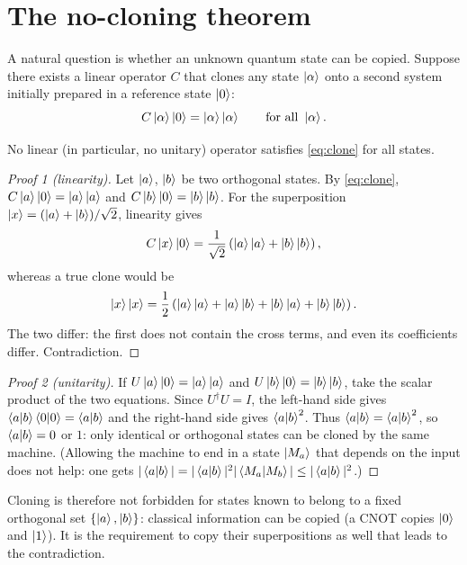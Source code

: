 \section{The no-cloning theorem}\label{sec:nocloning}
A natural question is whether an unknown quantum state can be copied. Suppose there exists a linear operator $C$ that clones any state $\left|\alpha\right\rangle$
onto a second system initially prepared in a reference state $\left|0\right\rangle$:
\begin{equation}\label{eq:clone}
  C\left|\alpha\right\rangle\left|0\right\rangle=\left|\alpha\right\rangle\left|\alpha\right\rangle\qquad\text{for all }\left|\alpha\right\rangle.
\end{equation}
\begin{theorem}
No linear (in particular, no unitary) operator satisfies \cref{eq:clone} for all states.
\end{theorem}
\begin{proof}[Proof 1 (linearity)]
Let $\left|a\right\rangle$, $\left|b\right\rangle$ be two orthogonal states. By \cref{eq:clone}, $C\left|a\right\rangle\left|0\right\rangle=\left|a\right\rangle\left|a\right\rangle$ and $C\left|b\right\rangle\left|0\right\rangle=\left|b\right\rangle\left|b\right\rangle$. For the
superposition $\left|x\right\rangle=(\left|a\right\rangle+\left|b\right\rangle)/\sqrt2$, linearity gives
\begin{equation}
  C\left|x\right\rangle\left|0\right\rangle=\frac1{\sqrt2}\left(\left|a\right\rangle\left|a\right\rangle+\left|b\right\rangle\left|b\right\rangle\right),
\end{equation}
whereas a true clone would be
\begin{equation}
  \left|x\right\rangle\left|x\right\rangle=\frac12\left(\left|a\right\rangle\left|a\right\rangle+\left|a\right\rangle\left|b\right\rangle+\left|b\right\rangle\left|a\right\rangle+\left|b\right\rangle\left|b\right\rangle\right).
\end{equation}
The two differ: the first does not contain the cross terms, and even its coefficients differ. Contradiction.
\end{proof}
\begin{proof}[Proof 2 (unitarity)]
If $U\left|a\right\rangle\left|0\right\rangle=\left|a\right\rangle\left|a\right\rangle$ and $U\left|b\right\rangle\left|0\right\rangle=\left|b\right\rangle\left|b\right\rangle$, take the scalar product of the two equations. Since $U^\dagger U=I$, the left-hand side gives
$\left\langle a\middle|b\right\rangle\left\langle0\middle|0\right\rangle=\left\langle a\middle|b\right\rangle$ and the right-hand side gives $\left\langle a\middle|b\right\rangle^2$. Thus $\left\langle a\middle|b\right\rangle=\left\langle a\middle|b\right\rangle^2$, so $\left\langle a\middle|b\right\rangle=0$ or $1$:
only identical or orthogonal states can be cloned by the same machine. (Allowing the machine to end in a state $\left|M_a\right\rangle$ that depends on the input does
not help: one gets $|\left\langle a\middle|b\right\rangle|=|\left\langle a\middle|b\right\rangle|^2|\left\langle M_a\middle|M_b\right\rangle|\le|\left\langle a\middle|b\right\rangle|^2$.)
\end{proof}
Cloning is therefore not forbidden for states known to belong to a fixed orthogonal set $\{\left|a\right\rangle,\left|b\right\rangle\}$: classical information can be copied (a CNOT
copies $\left|0\right\rangle$ and $\left|1\right\rangle$). It is the requirement to copy their superpositions as well that leads to the contradiction.

